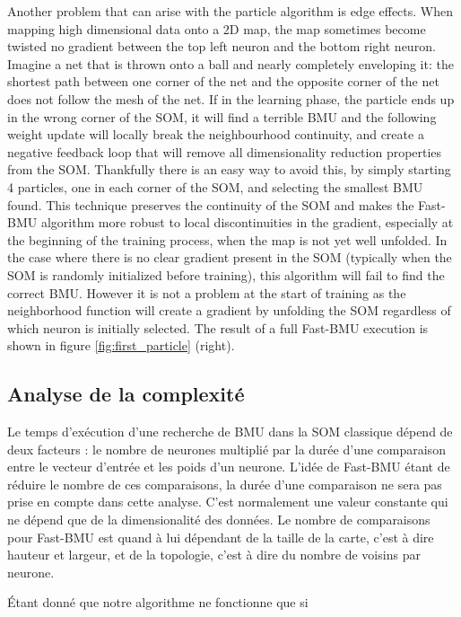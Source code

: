 	Another problem that can arise with the particle algorithm is edge effects. When mapping high dimensional data onto a 2D map, the map sometimes become twisted  no gradient between the top left neuron and the bottom right neuron. Imagine a net that is thrown onto a ball and nearly completely enveloping it: the shortest path between one corner of the net and the opposite corner of the net does not follow the mesh of the net. If in the learning phase, the particle ends up in the wrong corner of the SOM, it will find a terrible BMU and the following weight update will locally break the neighbourhood continuity, and create a negative feedback loop that will remove all dimensionality reduction properties from the SOM. Thankfully there is an easy way to avoid this, by simply starting 4 particles, one in each corner of the SOM, and selecting the smallest BMU found. This technique preserves the continuity of the SOM and makes the Fast-BMU algorithm more robust to local discontinuities in the gradient, especially at the beginning of the training process, when the map is not yet well unfolded. In the case where there is no clear gradient present in the SOM (typically when the SOM is randomly initialized before training), this algorithm will fail to find the correct BMU. However it is not a problem at the start of training as the neighborhood function will create a gradient by unfolding the SOM regardless of which neuron is initially selected. The result of a full Fast-BMU execution is shown in figure \ref{fig:first_particle} (right).

	\subsection{Analyse de la complexité}

	Le temps d'exécution d'une recherche de BMU dans la SOM classique dépend de deux facteurs : le nombre de neurones multiplié par la durée d'une comparaison entre le vecteur d'entrée et les poids d'un neurone. L'idée de Fast-BMU étant de réduire le nombre de ces comparaisons, la durée d'une comparaison ne sera pas prise en compte dans cette analyse. C'est normalement une valeur constante qui ne dépend que de la dimensionalité des données. Le nombre de comparaisons pour Fast-BMU est quand à lui dépendant de la taille de la carte, c'est à dire hauteur et largeur, et de la topologie, c'est à dire du nombre de voisins par neurone. 

	Étant donné que notre algorithme ne fonctionne que si 

